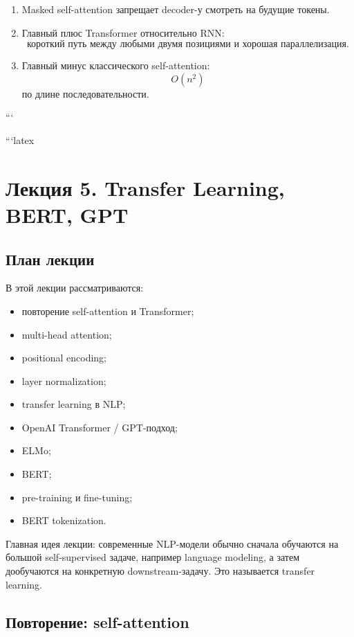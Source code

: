 \documentclass[a4paper,12pt]{article}
\begin{document}
\begin{enumerate}
    \item Masked self-attention запрещает decoder-у смотреть на будущие токены.

    \item Главный плюс Transformer относительно RNN:
    \[
    \text{короткий путь между любыми двумя позициями и хорошая параллелизация}.
    \]

    \item Главный минус классического self-attention:
    \[
    O(n^2)
    \]
    по длине последовательности.
\end{enumerate}
```








```latex
\section{Лекция 5. Transfer Learning, BERT, GPT}

\subsection{План лекции}

В этой лекции рассматриваются:

\begin{itemize}
    \item повторение self-attention и Transformer;
    \item multi-head attention;
    \item positional encoding;
    \item layer normalization;
    \item transfer learning в NLP;
    \item OpenAI Transformer / GPT-подход;
    \item ELMo;
    \item BERT;
    \item pre-training и fine-tuning;
    \item BERT tokenization.
\end{itemize}

Главная идея лекции: современные NLP-модели обычно сначала обучаются на большой self-supervised задаче, например language modeling, а затем дообучаются на конкретную downstream-задачу. Это называется transfer learning.

\subsection{Повторение: self-attention}
\end{document}
